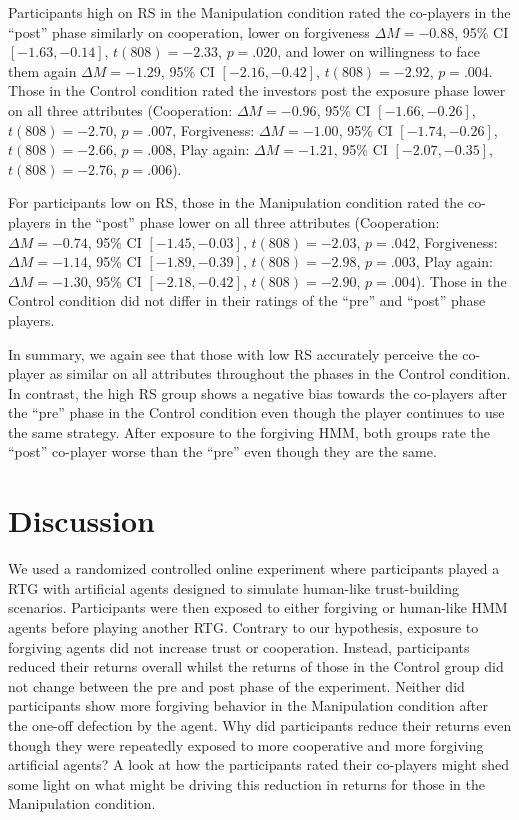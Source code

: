 \documentclass[
]{article}
\begin{document}
Participants high on RS in the Manipulation condition rated the co-players in the ``post'' phase similarly on cooperation, lower on
forgiveness \(\Delta M = -0.88\), 95\% CI \([-1.63, -0.14]\), \(t(808) = -2.33\), \(p = .020\),
and lower on willingness to face them again \(\Delta M = -1.29\), 95\% CI \([-2.16, -0.42]\), \(t(808) = -2.92\), \(p = .004\).
Those in the Control condition rated the investors post the exposure phase lower on all three attributes
(Cooperation: \(\Delta M = -0.96\), 95\% CI \([-1.66, -0.26]\), \(t(808) = -2.70\), \(p = .007\),
Forgiveness: \(\Delta M = -1.00\), 95\% CI \([-1.74, -0.26]\), \(t(808) = -2.66\), \(p = .008\),
Play again: \(\Delta M = -1.21\), 95\% CI \([-2.07, -0.35]\), \(t(808) = -2.76\), \(p = .006\)).

For participants low on RS, those in the Manipulation condition rated the co-players in the ``post'' phase lower on all three attributes
(Cooperation:\(\Delta M = -0.74\), 95\% CI \([-1.45, -0.03]\), \(t(808) = -2.03\), \(p = .042\),
Forgiveness: \(\Delta M = -1.14\), 95\% CI \([-1.89, -0.39]\), \(t(808) = -2.98\), \(p = .003\),
Play again: \(\Delta M = -1.30\), 95\% CI \([-2.18, -0.42]\), \(t(808) = -2.90\), \(p = .004\)).
Those in the Control condition did not differ in their ratings of the ``pre'' and ``post'' phase players.

In summary, we again see that those with low RS accurately perceive the co-player as similar on all attributes throughout the phases in the Control condition. In contrast, the high RS group shows a negative bias towards the co-players after the ``pre'' phase in the Control condition even though the player continues to use the same strategy. After exposure to the forgiving HMM, both groups rate the ``post'' co-player worse than the ``pre'' even though they are the same.

\section{Discussion}\label{discussion}

We used a randomized controlled online experiment where participants played a RTG with artificial agents designed to simulate human-like trust-building scenarios. Participants were then exposed to either forgiving or human-like HMM agents before playing another RTG. Contrary to our hypothesis, exposure to forgiving agents did not increase trust or cooperation. Instead, participants reduced their returns overall whilst the returns of those in the Control group did not change between the pre and post phase of the experiment. Neither did participants show more forgiving behavior in the Manipulation condition after the one-off defection by the agent. Why did participants reduce their returns even though they were repeatedly exposed to more cooperative and more forgiving artificial agents? A look at how the participants rated their co-players might shed some light on what might be driving this reduction in returns for those in the Manipulation condition.
\end{document}
